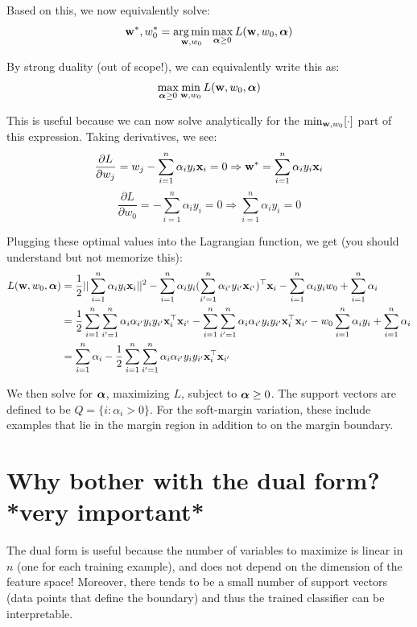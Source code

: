 \documentclass[11pt,letterpaper]{article}
\begin{document}
\noindent Based on this, we now equivalently solve:
%
$$
\boldw^*, w_0^* = \argmin_{\boldw,w_0} \max_{\boldsymbol{\alpha} \geq 0}L(\boldw, w_0, \balpha)
$$

\noindent By strong duality (out of scope!),
we can  equivalently write this as:
%
$$\max_{\boldsymbol{\alpha} \geq 0}\min_{\mathbf{w},w_0} L(\mathbf{w},w_0,\boldsymbol{\alpha})$$

\noindent This is useful because we can now solve
analytically for the $\min_{\mathbf{w},w_0}[\cdot]$
part of this expression. Taking derivatives, we see:
%
$$\frac{\partial L}{\partial w_j} = w_j - \sum_{i=1}^n \alpha_iy_i\mathbf{x}_i = 0 \Rightarrow \mathbf{w}^* = \sum_{i=1}^n \alpha_iy_i\mathbf{x}_i$$
$$\frac{\partial L}{\partial w_0} = -\sum_{i=1}^n \alpha_iy_i = 0 \Rightarrow \sum_{i=1}^n \alpha_iy_i = 0$$

\noindent Plugging these optimal values into the Lagrangian function, we get
(you should understand but not memorize this):
%
\begin{align*}
L(\mathbf{w}, w_0, \boldsymbol{\alpha}) &= \frac{1}{2}||\sum_{i=1}^n \alpha_iy_i\mathbf{x}_i||^2 - \sum_{i=1}^n \alpha_iy_i(\sum_{i'=1}^n \alpha_{i'}y_{i'}\mathbf{x}_{i'})^\top\mathbf{x}_i
- \sum_{i=1}^n\alpha_iy_iw_0 + \sum_{i=1}^n \alpha_i \\
&= \frac{1}{2} \sum_{i=1}^n \sum_{i'=1}^n \alpha_i \alpha_{i'} y_i y_{i'} \mathbf{x}_i^\top \mathbf{x}_{i'} - \sum_{i=1}^n \sum_{i'=1}^n \alpha_i \alpha_{i'} y_i y_{i'} \mathbf{x}_i^\top \mathbf{x}_{i'} - w_0 \sum_{i=1}^n \alpha_i y_i + \sum_{i=1}^n \alpha_i \\
&= \sum_{i=1}^n \alpha_i - \frac{1}{2}\sum_{i=1}^n \sum_{i'=1}^n \alpha_i\alpha_{i'}y_iy_{i'} \mathbf{x}_i^\top \mathbf{x}_{i'}
\end{align*}

\noindent We then solve for $\boldsymbol{\alpha}$, maximizing $L$,
subject to $\boldsymbol{\alpha}\geq 0$. The support
vectors are defined to be $Q = \{i : \alpha_i > 0\}$.
For the soft-margin variation, these include examples
that lie in the margin region in addition
to on the margin boundary.
	
\section{Why bother with the dual form? *very important*}

\noindent The dual form is useful because the number of variables to maximize
is linear in $n$ (one for each training example), and does not depend on
the dimension of the feature space! Moreover, there tends to
be a small number of support vectors (data points that define the boundary)
and thus the trained classifier can be interpretable. \\
\end{document}
